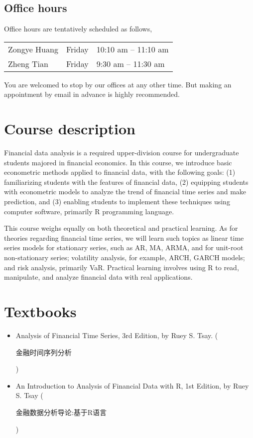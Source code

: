 \documentclass[a4paper,11pt]{article}
\begin{document}
\subsection*{Office hours}
\label{sec:orgbef4d38}
Office hours are tentatively scheduled as follows,

\begin{center}
\begin{tabular}{lll}
Zongye Huang & Friday & 10:10 am -- 11:10 am\\
Zheng Tian & Friday & 9:30 am -- 11:30 am\\
\end{tabular}
\end{center}

You are welcomed to stop by our offices at any other time. But making
an appointment by email in advance is highly recommended.


\section{Course description}
\label{sec:orgd72ef89}

Financial data analysis is a required upper-division course for
undergraduate students majored in financial economics. In this course,
we introduce basic econometric methods applied to financial data, with
the following goals: (1) familiarizing students with the features of
financial data, (2) equipping students with econometric models to
analyze the trend of financial time series and make prediction, and
(3) enabling students to implement these techniques using computer
software, primarily R programming language.

This course weighs equally on both theoretical and practical
learning. As for theories regarding financial time series, we will
learn such topics as linear time series models for stationary series,
such as AR, MA, ARMA, and for unit-root non-stationary series;
volatility analysis, for example, ARCH, GARCH models; and risk
analysis, primarily VaR. Practical learning involves using R to read,
manipulate, and analyze financial data with real applications.


\section{Textbooks}
\label{sec:orgf1a06be}

\begin{itemize}
\item Analysis of Financial Time Series, 3rd Edition, by Ruey S. Tsay.
(\begin{CJK}{UTF8}{gbsn}金融时间序列分析\end{CJK})

\item An Introduction to Analysis of Financial Data with R, 1st Edition,
by Ruey S. Tsay (\begin{CJK}{UTF8}{gbsn}金融数据分析导论:基于R语言
\end{CJK})
\end{itemize}
\end{document}
